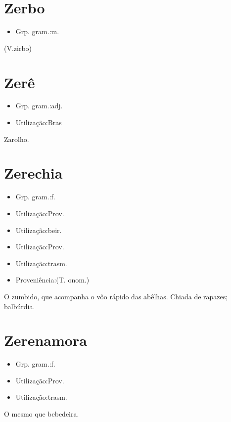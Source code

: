 \section{Zerbo}
\begin{itemize}
\item {Grp. gram.:m.}
\end{itemize}
(V.zirbo)
\section{Zerê}
\begin{itemize}
\item {Grp. gram.:adj.}
\end{itemize}
\begin{itemize}
\item {Utilização:Bras}
\end{itemize}
Zarolho.
\section{Zerechia}
\begin{itemize}
\item {Grp. gram.:f.}
\end{itemize}
\begin{itemize}
\item {Utilização:Prov.}
\end{itemize}
\begin{itemize}
\item {Utilização:beir.}
\end{itemize}
\begin{itemize}
\item {Utilização:Prov.}
\end{itemize}
\begin{itemize}
\item {Utilização:trasm.}
\end{itemize}
\begin{itemize}
\item {Proveniência:(T. onom.)}
\end{itemize}
O zumbido, que acompanha o vôo rápido das abêlhas.
Chiada de rapazes; balbúrdia.
\section{Zerenamora}
\begin{itemize}
\item {Grp. gram.:f.}
\end{itemize}
\begin{itemize}
\item {Utilização:Prov.}
\end{itemize}
\begin{itemize}
\item {Utilização:trasm.}
\end{itemize}
O mesmo que \textunderscore bebedeira\textunderscore .

